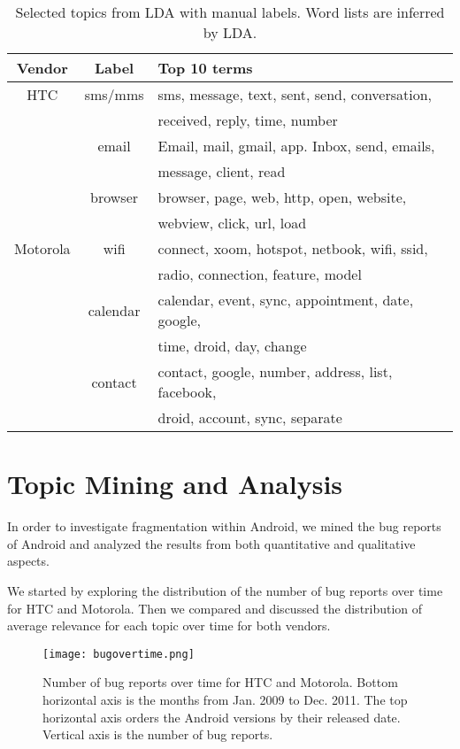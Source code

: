 \documentclass[10pt, conference, compsocconf]{IEEEtran}
\begin{document}
\begin{table}[!t]
\renewcommand{\arraystretch}{1.3}
\caption{Selected topics from LDA with manual labels. Word lists are inferred by LDA.}
\label{seleted2}
\centering
\begin{tabular}{|c||c||l|}
\hline
Vendor & Label & Top 10 terms\\
\hline
HTC & sms\//mms &sms, message, text, sent, send, conversation, \\
            && received, reply, time, number \\ \cline{2-3}
  & email & Email, mail, gmail, app. Inbox, send, emails, \\
            &&message, client, read \\ \cline{2-3}
  & browser&browser, page, web, http, open, website, \\
            &&webview, click, url, load\\
\hline
Motorola & wifi &connect, xoom, hotspot, netbook, wifi, ssid, \\
           &&radio, connection, feature, model\\ \cline{2-3}
    &calendar& calendar, event, sync, appointment, date, google, \\
           &&time, droid, day, change \\ \cline{2-3}
    &contact & contact, google, number, address, list, facebook, \\
           &&droid, account, sync, separate \\
\hline
\end{tabular}
\end{table}


\section{Topic Mining and Analysis}
\label{sec:topicanalysis}

In order to investigate fragmentation within Android, we mined the bug reports of Android and analyzed the results from both quantitative and qualitative aspects.

We started by exploring the distribution of the number of bug reports over time for HTC and Motorola. Then we compared and discussed the distribution of average relevance for each topic over time for both vendors.

\begin{figure*}[htb]
\centering
\texttt{[image: bugovertime.png]}
\caption{Number of bug reports over time for HTC and Motorola. Bottom horizontal axis is the months from Jan. 2009 to Dec. 2011. The top horizontal axis orders the Android versions by their released date. Vertical axis is the number of bug reports.}
\label{bugovertime}
\end{figure*}
\end{document}
